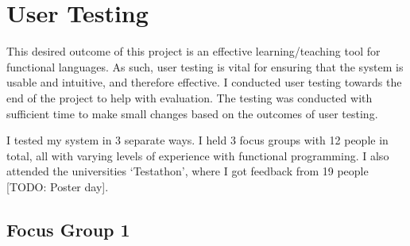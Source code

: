 \chapter{User Testing}
\label{chap:evaluation}

This desired outcome of this project is an effective learning/teaching tool for functional languages. As such, user testing is vital for ensuring that the system is usable and intuitive, and therefore effective. I conducted user testing towards the end of the project to help with evaluation. The testing was conducted with sufficient time to make small changes based on the outcomes of user testing.

I tested my system in 3 separate ways. I held 3 focus groups with 12 people in total, all with varying levels of experience with functional programming. I also attended the universities `Testathon', where I got feedback from 19 people [TODO: Poster day].


\section{Focus Group 1}